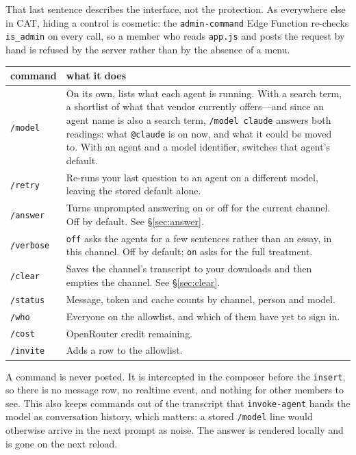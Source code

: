 \documentclass[11pt,letterpaper]{article}
\begin{document}
That last sentence describes the interface, not the protection. As everywhere
else in CAT, hiding a control is cosmetic: the \texttt{admin-command} Edge
Function re-checks \texttt{is\_admin} on every call, so a member who reads
\texttt{app.js} and posts the request by hand is refused by the server rather
than by the absence of a menu.

\begin{center}
\begin{tabular}{lp{8.2cm}}
\toprule
command & what it does\\
\midrule
\texttt{/model} & On its own, lists what each agent is running. With a search
term, a shortlist of what that vendor currently offers---and since an agent
name is also a search term, \texttt{/model claude} answers both readings: what
\texttt{@claude} is on now, and what it could be moved to. With an agent and a
model identifier, switches that agent's default.\\
\texttt{/retry} & Re-runs your last question to an agent on a different model,
leaving the stored default alone.\\
\texttt{/answer} & Turns unprompted answering on or off for the current
channel. Off by default. See \S\ref{sec:answer}.\\
\texttt{/verbose} & \texttt{off} asks the agents for a few sentences rather
than an essay, in this channel. Off by default; \texttt{on} asks for the full
treatment.\\
\texttt{/clear} & Saves the channel's transcript to your downloads and then
empties the channel. See \S\ref{sec:clear}.\\
\texttt{/status} & Message, token and cache counts by channel, person and
model.\\
\texttt{/who} & Everyone on the allowlist, and which of them have yet to sign
in.\\
\texttt{/cost} & OpenRouter credit remaining.\\
\texttt{/invite} & Adds a row to the allowlist.\\
\bottomrule
\end{tabular}
\end{center}

A command is never posted. It is intercepted in the composer before the
\texttt{insert}, so there is no message row, no realtime event, and nothing
for other members to see. This also keeps commands out of the transcript that
\texttt{invoke-agent} hands the model as conversation history, which matters:
a stored \texttt{/model} line would otherwise arrive in the next prompt as
noise. The answer is rendered locally and is gone on the next reload.
\end{document}
